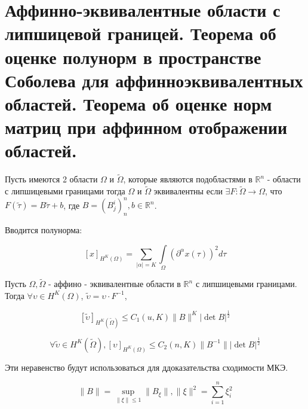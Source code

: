 \documentclass[__main__.tex]{subfiles}
\begin{document}
\section{Аффинно-эквивалентные области с липшицевой границей. Теорема об оценке полунорм в пространстве Соболева для аффинноэквивалентных областей. Теорема об оценке норм матриц при аффинном отображении областей.}

\begin{definition}
Пусть имеются 2 области $\Omega$ и $\tilde{\Omega}$, которые являются подобластями в $\mathbb{R}^n$ - области с липшицевыми границами тогда $\Omega$ и $\tilde{\Omega}$ эквивалентны если $\exists F: \tilde{\Omega} \rightarrow \Omega$, что $F\left(\tilde{\tau}\right) = B \tilde{\tau} + b$, где $B = \left(B^i_j\right)^n_n, b \in \mathbb{R}^n$.
\end{definition}

\begin{definition}
	Вводится полунорма:
	
	$$
	\left[x\right]_{H^K\left(\Omega\right)} = \sum_{\left|\alpha\right| = K} \int\limits_{\Omega} \left(\partial^\alpha x \left(\tau\right)\right)^2 d\tau
	$$
\end{definition}

\begin{theorem}
	Пусть $\Omega, \tilde{\Omega}$ - аффино - эквивалентные области в $\mathbb{R}^n$ с липшицевыми границами. Тогда $\forall \upsilon \in H^K \left(\Omega\right)$, $\tilde{\upsilon} = \upsilon \cdot F^{-1}$, 
	
	$$
	\left[\tilde{\upsilon}\right]_{H^K\left(\tilde{\Omega}\right)} \leq C_1 \left(u, K\right) \|B\|^K \left|\det B\right|^{\frac{1}{2}}
	$$
	
	$$
	\forall \tilde{\upsilon} \in H^K \left(\tilde{\Omega}\right), \left[\upsilon\right]_{H^K\left(\Omega\right)} \leq C_2 \left(n, K\right) \| B^{-1} \| \left|\det B\right|^{\frac{1}{2}}
	$$
	
	Эти неравенство будут использоваться для ддоказательства сходимости МКЭ. 
	
	$$
	\|B\| = \sup_{\|\xi\| \leq 1} \|B_{\xi}\|, \|\xi\|^2 = \sum_{i=1}^{n} \xi^2_i
	$$
\end{theorem}
\end{document}
